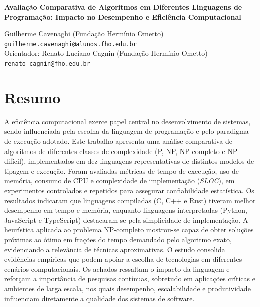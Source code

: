 \documentclass[12pt,a4paper]{article}
\newcommand{\eng}[1]{\textit{#1}}
\begin{document}

{\bfseries Avaliação Comparativa de Algoritmos em Diferentes Linguagens de Programação: Impacto no Desempenho e Eficiência Computacional}

\vspace{6pt}

Guilherme Cavenaghi (Fundação Hermínio Ometto) \texttt{guilherme.cavenaghi@alunos.fho.edu.br}\\
Orientador: Renato Luciano Cagnin (Fundação Hermínio Ometto) \texttt{renato\_cagnin@fho.edu.br}

\section*{Resumo}
A eficiência computacional exerce papel central no desenvolvimento de sistemas, sendo influenciada pela escolha da linguagem de programação e pelo paradigma de execução adotado. Este trabalho apresenta uma análise comparativa de algoritmos de diferentes classes de complexidade (P, NP, NP-completo e NP-difícil), implementados em dez linguagens representativas de distintos modelos de tipagem e execução. Foram avaliadas métricas de tempo de execução, uso de memória, consumo de CPU e complexidade de implementação (\eng{SLOC}), em experimentos controlados e repetidos para assegurar confiabilidade estatística. Os resultados indicaram que linguagens compiladas (C, C++ e Rust) tiveram melhor desempenho em tempo e memória, enquanto linguagens interpretadas (Python, JavaScript e TypeScript) destacaram-se pela simplicidade de implementação. A heurística aplicada ao problema NP-completo mostrou-se capaz de obter soluções próximas ao ótimo em frações do tempo demandado pelo algoritmo exato, evidenciando a relevância de técnicas aproximativas. O estudo consolida evidências empíricas que podem apoiar a escolha de tecnologias em diferentes cenários computacionais. Os achados ressaltam o impacto da linguagem e reforçam a importância de pesquisas contínuas, sobretudo em aplicações críticas e ambientes de larga escala, nos quais desempenho, escalabilidade e produtividade influenciam diretamente a qualidade dos sistemas de software.

\vspace{6pt}
\end{document}
